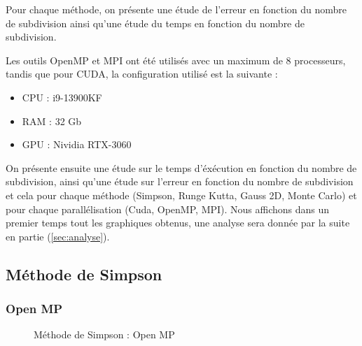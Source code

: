 \documentclass[10pt,a4paper]{article}
\begin{document}
Pour chaque méthode, on présente une étude de l'erreur en fonction du nombre de subdivision ainsi qu'une étude du temps en fonction du nombre de subdivision.

Les outils OpenMP et MPI ont été utilisés avec un maximum de 8 processeurs, tandis que pour CUDA, la configuration utilisé est la suivante : 
\begin{itemize}
    \item CPU : i9-13900KF
    \item RAM : 32 Gb
    \item GPU : Nividia RTX-3060
\end{itemize}

On présente ensuite une étude sur le temps d'éxécution en fonction du nombre de subdivision, ainsi qu'une étude sur l'erreur en fonction du nombre de subdivision et cela pour chaque méthode (Simpson, Runge Kutta, Gauss 2D, Monte Carlo) et pour chaque parallélisation (Cuda, OpenMP, MPI).
Nous affichons dans un premier temps tout les graphiques obtenus, une analyse sera donnée par la suite en partie (\ref{sec:analyse}).


\subsection{Méthode de Simpson}

\subsubsection{Open MP}


  \begin{figure}[H]
    \centering

    \hfill 
  
    \caption{Méthode de Simpson : Open MP}
    \label{fig:simpMP}
  \end{figure}
\end{document}
